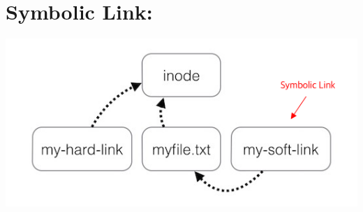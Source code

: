 \documentclass[12pt]{article}
\begin{document}
\section{Symbolic Link:}


\begin{center}
\includegraphics[width=0.8\linewidth]{../images/midterm_4_solution_48.png}
\end{center}
\end{document}
